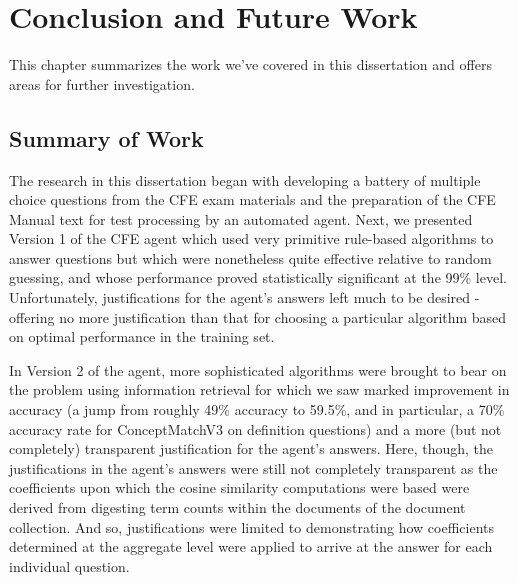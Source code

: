  

\chapter{Conclusion and Future Work}

This chapter summarizes the work we’ve covered in this dissertation and offers areas for further investigation.

\section{Summary of Work}

The research in this dissertation began with developing a battery of multiple choice questions from the CFE exam materials and the preparation of the CFE Manual text for test processing by an automated agent. Next, we presented Version 1 of the CFE agent which used very primitive rule-based algorithms to answer questions but which were nonetheless quite effective relative to random guessing, and whose performance proved statistically significant at the 99\% level. Unfortunately, justifications for the agent’s answers left much to be desired - offering no more justification than that for choosing a particular algorithm based on optimal performance in the training set.  

In Version 2 of the agent, more sophisticated algorithms were brought to bear on the problem using information retrieval for which we saw marked improvement in accuracy (a jump from roughly 49\% accuracy to 59.5\%, and in particular, a 70\% accuracy rate for ConceptMatchV3 on definition questions) and a more (but not completely) transparent justification for the agent’s answers. Here, though, the justifications in the agent’s answers were still not completely transparent as the coefficients upon which the cosine similarity computations were based were derived from digesting term counts within the documents of the document collection. And so, justifications were limited to demonstrating how coefficients determined at the aggregate level were applied to arrive at the answer for each individual question.

